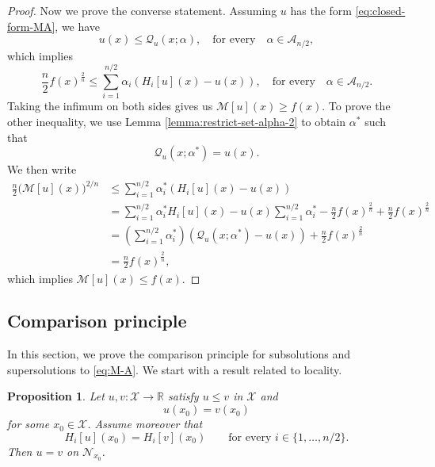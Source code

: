 \documentclass[reqno,11pt]{amsart}
\numberwithin{equation}{section}
\newtheorem{proposition}[theorem]{Proposition}
\theoremstyle{definition}
\theoremstyle{remark}
\begin{document}
\begin{proof}
Now we prove the converse statement. Assuming $u$ has the form \eqref{eq:closed-form-MA}, we have
\[
    u(x) \leq \mathcal{Q}_u(x;\alpha), \quad \text{for every} \quad \alpha \in \mathcal{A}_{n/2},
\]
which implies
\[
    \frac{n}{2}f(x)^{\frac{2}{n}} \leq \sum_{i=1}^{n/2}\alpha_i(H_i[u](x) - u(x)), \quad \text{for every} \quad \alpha \in \mathcal{A}_{n/2}.
\]
Taking the infimum on both sides gives us \(\mathcal{M}[u](x) \geq f(x)\). To prove the other inequality, we use Lemma \ref{lemma:restrict-set-alpha-2} to obtain $\alpha^*$ such that
\[
    \mathcal{Q}_u(x;\alpha^*) = u(x).
\]
We then write
\begin{align*}
    \frac n2\bigl(\mathcal M[u](x)\bigr)^{2/n} & \leq \sum_{i=1}^{n/2}\alpha^*_i \left(H_i[u](x)-u(x)\right)\\
                    & = \sum_{i=1}^{n/2}\alpha^*_i H_i[u](x) - u(x) \sum_{i=1}^{n/2}\alpha^*_i - \frac{n}{2}f(x)^{\frac{2}{n}} + \frac{n}{2}f(x)^{\frac{2}{n}}\\
                    & = \left(\sum_{i=1}^{n/2}\alpha^*_i\right) \left(\mathcal{Q}_u(x;\alpha^*) - u(x)\right) + \frac{n}{2}f(x)^{\frac{2}{n}}\\
                    & = \frac{n}{2}f(x)^{\frac{2}{n}},
\end{align*}
which implies \(\mathcal{M}[u](x) \leq f(x)\).
\end{proof}

\subsection{Comparison principle}

In this section, we prove the comparison principle for subsolutions and supersolutions to \eqref{eq:M-A}. We start with a result related to locality.

\begin{proposition}\label{prop:propagation-to-boundary}
Let \(u,v\colon\mathcal X\to \mathbb R\) satisfy \(u\le v\) in \(\mathcal X\) and
\[
    u(x_0)=v(x_0)
\]
for some \(x_0\in \mathcal X\). Assume moreover that
\[
    H_i[u](x_0)=H_i[v](x_0)\qquad \text{for every } i\in\{1,\dots,n/2\}.
\]
Then \(u=v\) on \(\mathcal N_{x_0}\).
\end{proposition}
\end{document}
